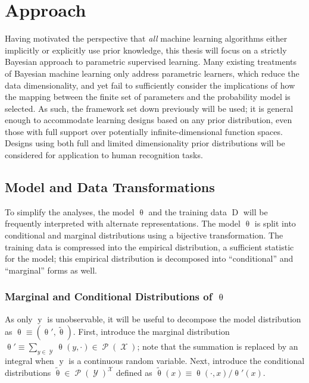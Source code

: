 \documentclass[12pt]{report}
\DeclareMathOperator{\yrm}{\mathrm{y}}
\DeclareMathOperator{\Drm}{\mathrm{D}}
\DeclareMathOperator{\Xcal}{\mathcal{X}}
\DeclareMathOperator{\Ycal}{\mathcal{Y}}
\DeclareMathOperator{\Pcal}{\mathcal{P}}
\begin{document}
\chapter{Approach} \label{sec:approach}

Having motivated the perspective that \emph{all} machine learning algorithms either implicitly or explicitly use prior knowledge, this thesis will focus on a strictly Bayesian approach to parametric supervised learning. Many existing treatments of Bayesian machine learning only address parametric learners, which reduce the data dimensionality, and yet fail to sufficiently consider the implications of how the mapping between the finite set of parameters and the probability model is selected. As such, the  framework set down previously will be used; it is general enough to accommodate learning designs based on any prior distribution, even those with full support over potentially infinite-dimensional function spaces. Designs using both full and limited dimensionality prior distributions will be considered for application to human recognition tasks.




\section{Model and Data Transformations}

To simplify the analyses, the model $\uptheta$ and the training data $\Drm$ will be frequently interpreted with alternate representations. The model $\uptheta$ is split into conditional and marginal distributions using a bijective transformation. The training data is compressed into the empirical distribution, a sufficient statistic for the model; this empirical distribution is decomposed into ``conditional'' and ``marginal'' forms as well.



\subsection{Marginal and Conditional Distributions of $\uptheta$}

As only $\yrm$ is unobservable, it will be useful to decompose the model distribution as $\uptheta \equiv (\uptheta',\tilde{\uptheta})$. First, introduce the marginal distribution $\uptheta' \equiv \sum_{y \in \Ycal} \uptheta(y,\cdot) \in \Pcal(\Xcal)$; note that the summation is replaced by an integral when $\yrm$ is a continuous random variable. Next, introduce the conditional distributions $\tilde{\uptheta} \in \Pcal(\Ycal)^{\Xcal}$ defined as $\tilde{\uptheta}(x) \equiv \uptheta(\cdot,x) / \uptheta'(x)$. 
\end{document}
